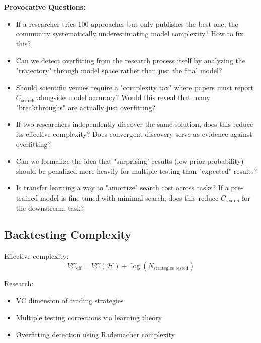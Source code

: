   \textbf{Provocative Questions:}
  \begin{itemize}
    \item If a researcher tries 100 approaches but only publishes the best
      one, the community systematically underestimating model complexity?
      How to fix this?

    \item Can we detect overfitting from the research process itself by analyzing
      the "trajectory" through model space rather than just the final model?

    \item Should scientific venues require a "complexity tax" where papers
      must report $C_{\text{search}}$ alongside model accuracy? Would
      this reveal that many "breakthroughs" are actually just
      overfitting?

    \item If two researchers independently discover the same solution,
      does this reduce its effective complexity? Does convergent discovery
      serve as evidence against overfitting?

    \item Can we formalize the idea that "surprising" results (low prior
      probability) should be penalized more heavily for multiple testing
      than "expected" results?

    \item Is transfer learning a way to "amortize" search cost across tasks?
      If a pre-trained model is fine-tuned with minimal search, does this
      reduce $C_{\text{search}}$ for the downstream task?
  \end{itemize}

  \subsection*{Backtesting Complexity}

  Effective complexity:
  \[
    VC_{\text{eff}}= VC(\mathcal{H}) + \log(N_{\text{strategies tested}})
  \]

  Research:
  \begin{itemize}
    \item VC dimension of trading strategies

    \item Multiple testing corrections via learning theory

    \item Overfitting detection using Rademacher complexity
  \end{itemize}


